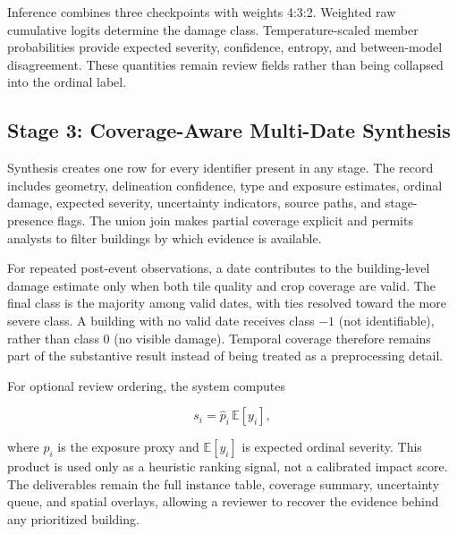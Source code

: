 Inference combines three checkpoints with weights 4:3:2. Weighted raw cumulative logits determine the damage class. Temperature-scaled member probabilities provide expected severity, confidence, entropy, and between-model disagreement. These quantities remain review fields rather than being collapsed into the ordinal label.

\subsection{Stage 3: Coverage-Aware Multi-Date Synthesis}
\label{sec:method_stage3}

Synthesis creates one row for every identifier present in any stage. The record includes geometry, delineation confidence, type and exposure estimates, ordinal damage, expected severity, uncertainty indicators, source paths, and stage-presence flags. The union join makes partial coverage explicit and permits analysts to filter buildings by which evidence is available.

For repeated post-event observations, a date contributes to the building-level damage estimate only when both tile quality and crop coverage are valid. The final class is the majority among valid dates, with ties resolved toward the more severe class. A building with no valid date receives class $-1$ (not identifiable), rather than class 0 (no visible damage). Temporal coverage therefore remains part of the substantive result instead of being treated as a preprocessing detail.

For optional review ordering, the system computes

\begin{equation}
s_i = \widehat{p}_i\,\mathbb{E}[y_i],
\label{eq:ranking_score}
\end{equation}

where $\widehat{p}_i$ is the exposure proxy and $\mathbb{E}[y_i]$ is expected ordinal severity. This product is used only as a heuristic ranking signal, not a calibrated impact score. The deliverables remain the full instance table, coverage summary, uncertainty queue, and spatial overlays, allowing a reviewer to recover the evidence behind any prioritized building.
